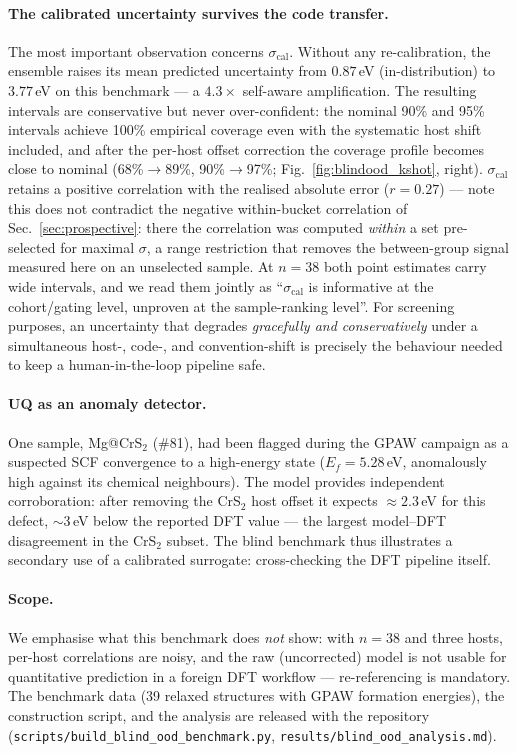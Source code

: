 \paragraph{The calibrated uncertainty survives the code transfer.}

The most important observation concerns
$\sigma_{\mathrm{cal}}$. Without any re-calibration, the ensemble
raises its mean predicted uncertainty from $0.87$\,eV
(in-distribution) to $3.77$\,eV on this benchmark --- a $4.3\times$
self-aware amplification. The resulting intervals are conservative
but never over-confident: the nominal 90\% and 95\% intervals achieve
100\% empirical coverage even with the systematic host shift
included, and after the per-host offset correction the coverage
profile becomes close to nominal (68\%$\to$89\%, 90\%$\to$97\%;
Fig.~\ref{fig:blindood_kshot}, right). $\sigma_{\mathrm{cal}}$
retains a positive correlation with the realised absolute error
($r=0.27$) --- note this does not contradict the negative
within-bucket correlation of Sec.~\ref{sec:prospective}: there the
correlation was computed \emph{within} a set pre-selected for
maximal $\sigma$, a range restriction that removes the
between-group signal measured here on an unselected sample. At
$n=38$ both point estimates carry wide intervals, and we read them
jointly as ``$\sigma_{\mathrm{cal}}$ is informative at the
cohort/gating level, unproven at the sample-ranking level''.
For screening purposes, an uncertainty that degrades
\emph{gracefully and conservatively} under a simultaneous
host-, code-, and convention-shift is precisely the behaviour needed
to keep a human-in-the-loop pipeline safe.

\paragraph{UQ as an anomaly detector.}

One sample, Mg@CrS$_2$ (\#81), had been flagged during the GPAW
campaign as a suspected SCF convergence to a high-energy state
($E_f=5.28$\,eV, anomalously high against its chemical neighbours).
The model provides independent corroboration: after removing the
CrS$_2$ host offset it expects $\approx 2.3$\,eV for this defect,
$\sim$3\,eV below the reported DFT value --- the largest
model--DFT disagreement in the CrS$_2$ subset. The blind benchmark
thus illustrates a secondary use of a calibrated surrogate:
cross-checking the DFT pipeline itself.

\paragraph{Scope.}

We emphasise what this benchmark does \emph{not} show: with
$n=38$ and three hosts, per-host correlations are noisy, and the
raw (uncorrected) model is not usable for quantitative prediction in
a foreign DFT workflow --- re-referencing is mandatory. The benchmark
data (39 relaxed structures with GPAW formation energies), the
construction script, and the analysis are released with the
repository
(\texttt{scripts/build\_blind\_ood\_benchmark.py},
\texttt{results/blind\_ood\_analysis.md}).
